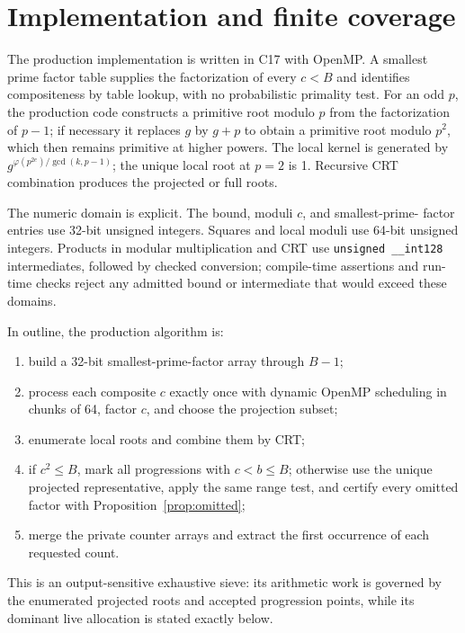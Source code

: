 \documentclass[11pt]{article}
\begin{document}
\section{Implementation and finite coverage}

The production implementation is written in C17 with OpenMP.  A smallest
prime factor table supplies the factorization of every $c<B$ and identifies
compositeness by table lookup, with no probabilistic primality test.  For an
odd $p$, the production code constructs a primitive root modulo $p$ from the
factorization of $p-1$; if necessary it replaces $g$ by $g+p$ to obtain a
primitive root modulo $p^2$, which then remains primitive at higher powers.
The local kernel is generated by
$g^{\varphi(p^{2e})/\gcd(k,p-1)}$; the unique local root at $p=2$ is 1.
Recursive CRT combination produces the projected or full roots.

The numeric domain is explicit.  The bound, moduli $c$, and smallest-prime-
factor entries use 32-bit unsigned integers.  Squares and local moduli use
64-bit unsigned integers.  Products in modular multiplication and CRT use
\texttt{unsigned \_\_int128} intermediates, followed by checked conversion;
compile-time assertions and run-time checks reject any admitted bound or
intermediate that would exceed these domains.

In outline, the production algorithm is:
\begin{enumerate}
\item build a 32-bit smallest-prime-factor array through $B-1$;
\item process each composite $c$ exactly once with dynamic OpenMP scheduling
      in chunks of 64, factor $c$, and choose the projection subset;
\item enumerate local roots and combine them by CRT;
\item if $c^2\leq B$, mark all progressions with $c<b\leq B$; otherwise use
      the unique projected representative, apply the same range test, and
      certify every omitted factor with Proposition~\ref{prop:omitted};
\item merge the private counter arrays and extract the first occurrence of
      each requested count.
\end{enumerate}
This is an output-sensitive exhaustive sieve: its arithmetic work is governed
by the enumerated projected roots and accepted progression points, while its
dominant live allocation is stated exactly below.
\end{document}
